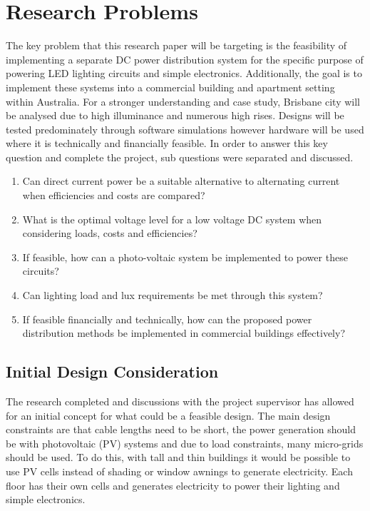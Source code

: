 
\section{Research Problems}

The key problem that this research paper will be targeting is the feasibility of implementing a separate DC power distribution system for the specific purpose of powering LED lighting circuits and simple electronics. Additionally, the goal is to implement these systems into a commercial building and apartment setting within Australia. For a stronger understanding and case study, Brisbane city will be analysed due to high illuminance and numerous high rises. Designs will be tested predominately through software simulations however hardware will be used where it is technically and financially feasible. In order to answer this key question and complete the project, sub questions were separated and discussed.

\begin{enumerate}
\itemsep-0.5em 
\item Can direct current power be a suitable alternative to alternating current when efficiencies and costs are compared?
\item What is the optimal voltage level for a low voltage DC system when considering loads, costs and efficiencies?
\item If feasible, how can a photo-voltaic system be implemented to power these circuits?
\item Can lighting load and lux requirements be met through this system?
\item If feasible financially and technically, how can the proposed power distribution methods be implemented in commercial buildings effectively?
\end{enumerate} 

\subsection{Initial Design Consideration}

The research completed and discussions with the project supervisor has allowed for an initial concept for what could be a feasible design. The main design constraints are that cable lengths need to be short, the power generation should be with photovoltaic (PV) systems and due to load constraints, many micro-grids should be used. To do this, with tall and thin buildings it would be possible to use PV cells instead of shading or window awnings to generate electricity. Each floor has their own cells and generates electricity to power their lighting and simple electronics. 
\newline

